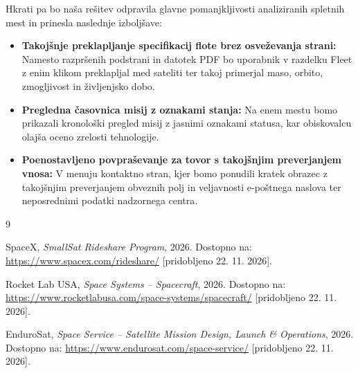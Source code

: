 \documentclass[11pt, a4paper]{article}
\begin{document}
Hkrati pa bo naša rešitev odpravila glavne pomanjkljivosti analiziranih spletnih mest in prinesla naslednje izboljšave:
\begin{itemize}
    \item \textbf{Takojšnje preklapljanje specifikacij flote brez osveževanja strani:} Namesto razpršenih podstrani in datotek PDF bo uporabnik v razdelku Fleet z enim klikom preklapljal med sateliti ter takoj primerjal maso, orbito, zmogljivost in življenjsko dobo.
    \item \textbf{Pregledna časovnica misij z oznakami stanja:} Na enem mestu bomo prikazali kronološki pregled misij z jasnimi oznakami statusa, kar obiskovalcu olajša oceno zrelosti tehnologije.
    \item \textbf{Poenostavljeno povpraševanje za tovor s takojšnjim preverjanjem vnosa:} V menuju kontaktno stran, kjer bomo ponudili kratek obrazec z takojšnjim preverjanjem obveznih polj in veljavnosti e-poštnega naslova ter neposrednimi podatki nadzornega centra.
\end{itemize}


\begin{table}[H]
    \centering
    \caption{Primerjava funkcionalnosti obstoječih rešitev in platforme Nexus Orbital.}
    \label{tab:primerjava}
\end{table}

\begin{thebibliography}{9}

SpaceX, \emph{SmallSat Rideshare Program}, 2026. Dostopno na: \url{https://www.spacex.com/rideshare/} [pridobljeno 22. 11. 2026].

Rocket Lab USA, \emph{Space Systems -- Spacecraft}, 2026. Dostopno na: \url{https://www.rocketlabusa.com/space-systems/spacecraft/} [pridobljeno 22. 11. 2026].

EnduroSat, \emph{Space Service -- Satellite Mission Design, Launch \& Operations}, 2026. Dostopno na: \url{https://www.endurosat.com/space-service/} [pridobljeno 22. 11. 2026].

\end{thebibliography}
\end{document}
